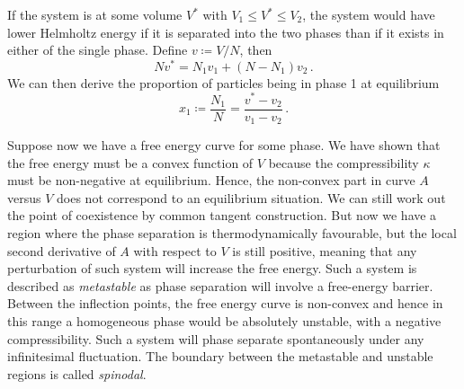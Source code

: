 \documentclass{article}
\theoremstyle{plain}\theoremheaderfont{\normalfont\bfseries}\theorembodyfont{\rmfamily}\theoremseparator{.}\newtheorem*{thm}{Theorem}\newtheorem*{law}{Law}\newtheorem*{pos}{Postulate}
\numberwithin{equation}{section}
\begin{document}
    \begin{figure}[ht!]
        \centering
    \end{figure}

    If the system is at some volume \(V^*\) with \(V_1\le V^*\le V_2\), the system would have lower Helmholtz energy if it is separated into the two phases than if it exists in either of the single phase. Define \(v\coloneqq V/N\), then
    \begin{equation}
        Nv^*=N_1v_1+(N-N_1)v_2\,.
    \end{equation}
    We can then derive the proportion of particles being in phase 1 at equilibrium
    \begin{equation}
        x_1\coloneqq\frac{N_1}{N}=\frac{v^*-v_2}{v_1-v_2}\,.
    \end{equation}

    Suppose now we have a free energy curve for some phase. We have shown that the free energy must be a convex function of \(V\) because the compressibility \(\kappa\) must be non-negative at equilibrium. Hence, the non-convex part in curve \(A\) versus \(V\) does not correspond to an equilibrium situation. We can still work out the point of coexistence by common tangent construction. But now we have a region where the phase separation is thermodynamically favourable, but the local second derivative of \(A\) with respect to \(V\) is still positive, meaning that any perturbation of such system will increase the free energy. Such a system is described as \textit{metastable} as phase separation will involve a free-energy barrier. Between the inflection points, the free energy curve is non-convex and hence in this range a homogeneous phase would be absolutely unstable, with a negative compressibility. Such a system will phase separate spontaneously under any infinitesimal fluctuation. The boundary between the metastable and unstable regions is called \textit{spinodal}.
\end{document}
